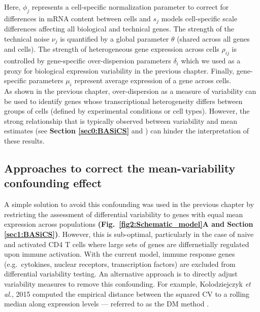 Here, $\phi_j$ represents a cell-specific normalization parameter to correct for differences in mRNA content between cells and $s_j$ models cell-specific scale differences affecting all biological and technical genes. The strength of the technical noise $\nu_j$ is quantified by a global parameter $\theta$ (shared across all genes and cells). The strength of heterogeneous gene expression across cells $\rho_{ij}$ is controlled by gene-specific over-dispersion parameters $\delta_i$ which we used as a proxy for biological expression variability in the previous chapter.  Finally, gene-specific parameters $\mu_i$ represent average expression of a gene across cells. \\

As shown in the previous chapter, over-dispersion as a measure of variability can be used to identify genes whose transcriptional heterogeneity differs between groups of cells (defined by experimental conditions or cell types). However, the strong relationship that is typically observed between variability and mean estimates (see \textbf{Section \ref{sec0:BASiCS}} and \citep{Brennecke2013}) can hinder the interpretation of these results. 

\newpage

\subsection{Approaches to correct the mean-variability confounding effect}

A simple solution to avoid this confounding was used in the previous chapter by restricting the assessment of differential variability to genes with equal mean expression across populations \textbf{(Fig.~\ref{fig2:Schematic_model}A and Section \ref{sec1:BASiCS})}. However, this is sub-optimal, particularly in the case of naive and activated CD4\plus{} T cells where large sets of genes are differnetially regulated upon immune activation. With the current model, immune response genes (e.g.~cytokines, nuclear receptors, transcription factors) are excluded from differential variability testing. An alternative approach is to directly adjust variability measures to remove this confounding. For example, Kolodziejczyk \emph{et al.}, 2015 computed the empirical distance between the squared CV to a rolling median along expression levels --- referred to as the DM method \citep{Newman2006, Kolodziejczyk2015cell}.  \\


